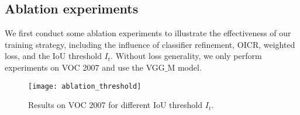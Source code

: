 \documentclass[10pt,twocolumn,letterpaper]{article}
\def\methodname{OICR}
\begin{document}
\subsection{Ablation experiments}
\label{sec:abl_exp}

We first conduct some ablation experiments to illustrate the effectiveness of our training strategy, including the influence of classifier refinement, \methodname, weighted loss, and the IoU threshold $I_{t}$.
Without loss generality, we only perform experiments on VOC 2007 and use the VGG$\_$M model.


\begin{figure}[t]
\begin{center}
   \texttt{[image: ablation\_threshold]}
\end{center}
   \caption{Results on VOC 2007 for different IoU threshold $I_{t}$.}
\label{fig:ablation_threshold}
\end{figure}
\end{document}

